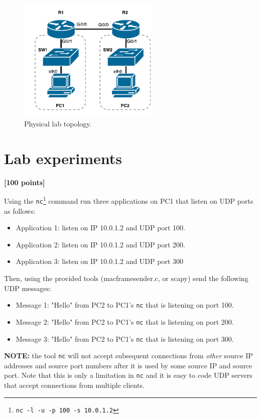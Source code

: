 \documentclass[pdftex,12pt,a4paper]{article}
\begin{document}
        \begin{figure}[tbh]
            \centering
            \includegraphics[width=0.6\textwidth]{figures/labtop}
            \caption{Physical lab topology.}
            \label{fig:labtop}
        \end{figure}

    \section{Lab experiments}
        \begin{flushright}
            \textbf{[100 points]}
        \end{flushright}

        Using the \texttt{nc}\footnote{\texttt{nc -l -u -p 100 -s 10.0.1.2}}
        command run three applications on PC1 that listen on UDP ports as
        follows:
        \begin{itemize}
            \item Application 1: listen on IP 10.0.1.2 and UDP port 100.
            \item Application 2: listen on IP 10.0.1.2 and UDP port 200.
            \item Application 3: listen on IP 10.0.1.2 and UDP port 300
        \end{itemize}

        Then, using the provided tools (macframesender.c, or scapy) send the
        following UDP messages:
        \begin{itemize}
            \item Message 1: "Hello" from PC2 to PC1's \texttt{nc} that is
                listening on port 100.
            \item Message 2: "Hello" from PC2 to PC1's \texttt{nc} that is
                listening on port 200.
            \item Message 3: "Hello" from PC2 to PC1's \texttt{nc} that is
                listening on port 300.
        \end{itemize}

        \textbf{NOTE:} the tool \texttt{nc} will not accept subsequent
        connections from \emph{other} source IP addresses and source port
        numbers after it is used by some source IP and source port. Note that
        this is only a limitation in \texttt{nc} and it is easy to code UDP
        servers that accept connections from multiple clients.
\end{document}
